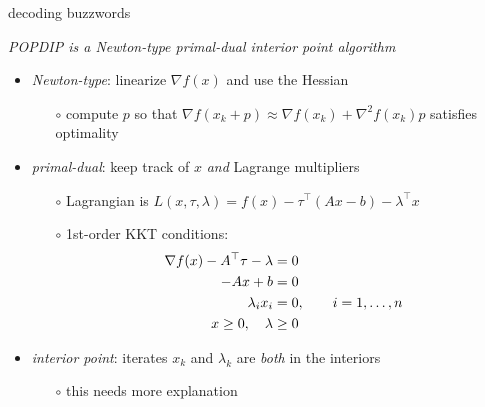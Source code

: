\documentclass[10pt,hyperref,dvipsnames]{beamer}
\newcommand{\grad}{\nabla}
\newcommand{\ds}{\displaystyle}
\begin{document}
\begin{frame}{decoding buzzwords}

\begin{center}
\emph{POPDIP is a {\color{BrickRed} Newton-type} {\color{OliveGreen} primal-dual} {\color{blue} interior point} algorithm}
\end{center}

\begin{itemize}
\item \emph{{\color{BrickRed} Newton-type}}: linearize $\grad f(x)$ and use the Hessian
    \begin{itemize}
    \item[$\circ$] compute $p$ so that $\grad f(x_k + p) \approx \grad f(x_k) + \grad^2 f(x_k) p$ satisfies optimality
    \end{itemize}
\item \emph{{\color{OliveGreen} primal-dual}}: keep track of $x$ \emph{and} Lagrange multipliers
    \begin{itemize}
    \item[$\circ$] Lagrangian is \qquad $\ds L(x,\tau,\lambda) = f(x) - \tau^\top (Ax - b) - \lambda^\top x$
    \item[$\circ$] 1st-order KKT conditions:
\begin{align*}
\grad f(x) - A^\top \tau - \lambda &= 0 \\
-A x + b &= 0 \notag \\
\lambda_i x_i &=0, \qquad i=1,\dots,n \notag \\
x \ge 0, \quad \lambda &\ge 0 \notag
\end{align*}
    \end{itemize}
\item \emph{{\color{blue} interior point}}: iterates $x_k$ and $\lambda_k$ are \emph{both} in the interiors
    \begin{itemize}
    \item[$\circ$] this needs more explanation
    \end{itemize}
\end{itemize}
\end{frame}
\end{document}
